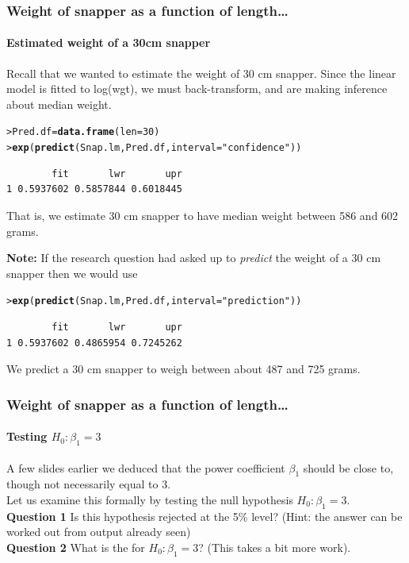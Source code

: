 \documentclass{beamer}\usepackage[]{graphicx}\usepackage[]{xcolor}
\makeatletter
\newcommand{\hlnum}[1]{\textcolor[rgb]{0.686,0.059,0.569}{#1}}%
\newcommand{\hlstr}[1]{\textcolor[rgb]{0.192,0.494,0.8}{#1}}%
\newcommand{\hlstd}[1]{\textcolor[rgb]{0.345,0.345,0.345}{#1}}%
\newcommand{\hlkwb}[1]{\textcolor[rgb]{0.69,0.353,0.396}{#1}}%
\newcommand{\hlkwc}[1]{\textcolor[rgb]{0.333,0.667,0.333}{#1}}%
\newcommand{\hlkwd}[1]{\textcolor[rgb]{0.737,0.353,0.396}{\textbf{#1}}}%
\newenvironment{kframe}{%
 \def\at@end@of@kframe{}%
 \ifinner\ifhmode%
  \def\at@end@of@kframe{\end{minipage}}%
  \begin{minipage}{\columnwidth}%
 \fi\fi%
 \def\FrameCommand##1{\hskip\@totalleftmargin \hskip-\fboxsep
 \colorbox{shadecolor}{##1}\hskip-\fboxsep
     \hskip-\linewidth \hskip-\@totalleftmargin \hskip\columnwidth}%
 \MakeFramed {\advance\hsize-\width
   \@totalleftmargin\z@ \linewidth\hsize
   \@setminipage}}%
 {\par\unskip\endMakeFramed%
 \at@end@of@kframe}
\newenvironment{knitrout}{}{} %
\makeatother
\begin{document}
\begin{frame}[fragile]
\frametitle{Weight of snapper as a function of length\ldots}
\framesubtitle{Estimated weight of a 30cm snapper}

Recall that we wanted to estimate the weight of 30 cm snapper.
Since the linear model is fitted to log(wgt), we must back-transform,
and are making inference about median weight.

\begin{knitrout}\scriptsize
{}\color{fgcolor}\begin{kframe}
\begin{alltt}
\hlstd{> }\hlstd{Pred.df}\hlkwb{=}\hlkwd{data.frame}\hlstd{(}\hlkwc{len}\hlstd{=}\hlnum{30}\hlstd{)}
\hlstd{> }\hlkwd{exp}\hlstd{(}\hlkwd{predict}\hlstd{(Snap.lm,Pred.df,}\hlkwc{interval}\hlstd{=}\hlstr{"confidence"}\hlstd{))}
\end{alltt}
\begin{verbatim}
        fit       lwr       upr
1 0.5937602 0.5857844 0.6018445
\end{verbatim}
\end{kframe}
\end{knitrout}
That is, we estimate 30 cm snapper to have median weight between 586 and 602 grams.
\medskip

\textbf{Note:} If the research question had asked up to {\em predict} the weight of a 30 cm 
snapper then we would use
\begin{knitrout}\scriptsize
{}\color{fgcolor}\begin{kframe}
\begin{alltt}
\hlstd{> }\hlkwd{exp}\hlstd{(}\hlkwd{predict}\hlstd{(Snap.lm,Pred.df,}\hlkwc{interval}\hlstd{=}\hlstr{"prediction"}\hlstd{))}
\end{alltt}
\begin{verbatim}
        fit       lwr       upr
1 0.5937602 0.4865954 0.7245262
\end{verbatim}
\end{kframe}
\end{knitrout}
We predict a 30 cm snapper to weigh between about 487 and 725 grams.
\end{frame}


\begin{frame}[fragile]
\frametitle{Weight of snapper as a function of length\ldots}
\framesubtitle{Testing $H_0: \beta_1=3$}

A few slides earlier we deduced that the power coefficient $\beta_1$ should be close to,
though not necessarily equal to 3.\\
\bigskip
Let us examine this formally by testing the null hypothesis $H_0: \beta_1=3$.\\
\bigskip
\textbf{Question 1} Is this hypothesis rejected at the 5\% level?
(Hint: the answer can be worked out from output already seen) \\
\bigskip
\textbf{Question 2} What is the \pval{} for $H_0: \beta_1=3$? (This takes a bit more work).
\bigskip
\end{frame}
\end{document}
